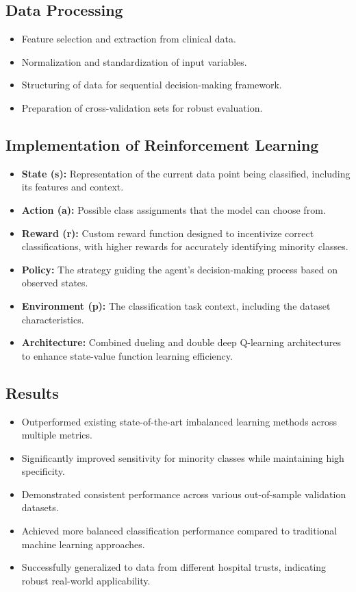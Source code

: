 \subsection*{Data Processing}
\begin{itemize}
    \item Feature selection and extraction from clinical data.
    \item Normalization and standardization of input variables.
    \item Structuring of data for sequential decision-making framework.
    \item Preparation of cross-validation sets for robust evaluation.
\end{itemize}

\subsection*{Implementation of Reinforcement Learning}
\begin{itemize}
    \item \textbf{State (s):} Representation of the current data point being classified, including its features and context.
    \item \textbf{Action (a):} Possible class assignments that the model can choose from.
    \item \textbf{Reward (r):} Custom reward function designed to incentivize correct classifications, with higher rewards for accurately identifying minority classes.
    \item \textbf{Policy:} The strategy guiding the agent's decision-making process based on observed states.
    \item \textbf{Environment (p):} The classification task context, including the dataset characteristics.
    \item \textbf{Architecture:} Combined dueling and double deep Q-learning architectures to enhance state-value function learning efficiency.
\end{itemize}

\subsection*{Results}
\begin{itemize}
    \item Outperformed existing state-of-the-art imbalanced learning methods across multiple metrics.
    \item Significantly improved sensitivity for minority classes while maintaining high specificity.
    \item Demonstrated consistent performance across various out-of-sample validation datasets.
    \item Achieved more balanced classification performance compared to traditional machine learning approaches.
    \item Successfully generalized to data from different hospital trusts, indicating robust real-world applicability.
\end{itemize}

